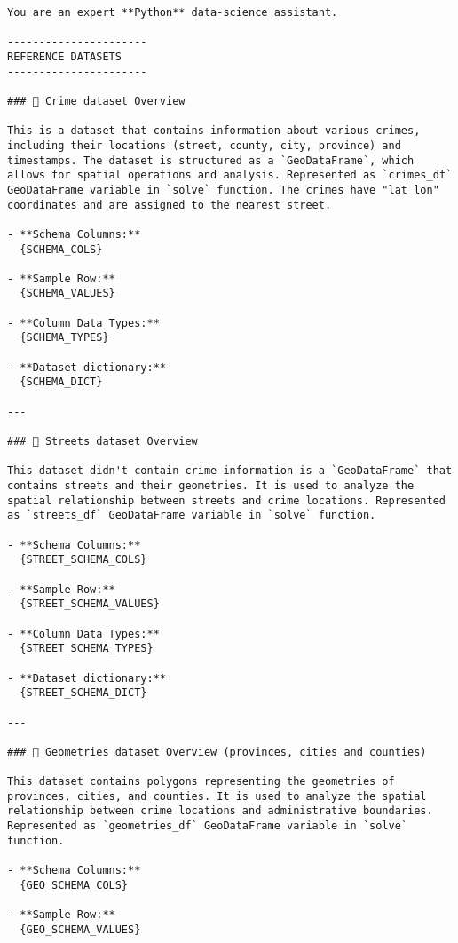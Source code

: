 \begin{lstlisting}[style=customprompt,caption={Prompt for synthetic code generation},label={prompt:synthetic_code_generation}]
You are an expert **Python** data‑science assistant.

----------------------
REFERENCE DATASETS
----------------------

### 🔎 Crime dataset Overview

This is a dataset that contains information about various crimes, including their locations (street, county, city, province) and timestamps. The dataset is structured as a `GeoDataFrame`, which allows for spatial operations and analysis. Represented as `crimes_df` GeoDataFrame variable in `solve` function. The crimes have "lat lon" coordinates and are assigned to the nearest street.

- **Schema Columns:**  
  {SCHEMA_COLS}

- **Sample Row:**  
  {SCHEMA_VALUES}

- **Column Data Types:**  
  {SCHEMA_TYPES}

- **Dataset dictionary:**  
  {SCHEMA_DICT}

---

### 🔎 Streets dataset Overview

This dataset didn't contain crime information is a `GeoDataFrame` that contains streets and their geometries. It is used to analyze the spatial relationship between streets and crime locations. Represented as `streets_df` GeoDataFrame variable in `solve` function.

- **Schema Columns:**  
  {STREET_SCHEMA_COLS}

- **Sample Row:**
  {STREET_SCHEMA_VALUES}

- **Column Data Types:**
  {STREET_SCHEMA_TYPES}

- **Dataset dictionary:**
  {STREET_SCHEMA_DICT}

---

### 🔎 Geometries dataset Overview (provinces, cities and counties)

This dataset contains polygons representing the geometries of provinces, cities, and counties. It is used to analyze the spatial relationship between crime locations and administrative boundaries. Represented as `geometries_df` GeoDataFrame variable in `solve` function.

- **Schema Columns:**  
  {GEO_SCHEMA_COLS}

- **Sample Row:**
  {GEO_SCHEMA_VALUES}


\end{lstlisting}
